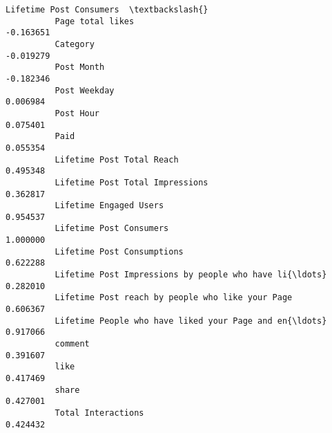 \documentclass[11pt]{article}
\begin{document}
\begin{Verbatim}[commandchars=\\\{\}]
                                                              Lifetime Post Consumers  \textbackslash{}
          Page total likes                                                  -0.163651   
          Category                                                          -0.019279   
          Post Month                                                        -0.182346   
          Post Weekday                                                       0.006984   
          Post Hour                                                          0.075401   
          Paid                                                               0.055354   
          Lifetime Post Total Reach                                          0.495348   
          Lifetime Post Total Impressions                                    0.362817   
          Lifetime Engaged Users                                             0.954537   
          Lifetime Post Consumers                                            1.000000   
          Lifetime Post Consumptions                                         0.622288   
          Lifetime Post Impressions by people who have li{\ldots}                 0.282010   
          Lifetime Post reach by people who like your Page                   0.606367   
          Lifetime People who have liked your Page and en{\ldots}                 0.917066   
          comment                                                            0.391607   
          like                                                               0.417469   
          share                                                              0.427001   
          Total Interactions                                                 0.424432   
          

\end{Verbatim}
\end{document}
